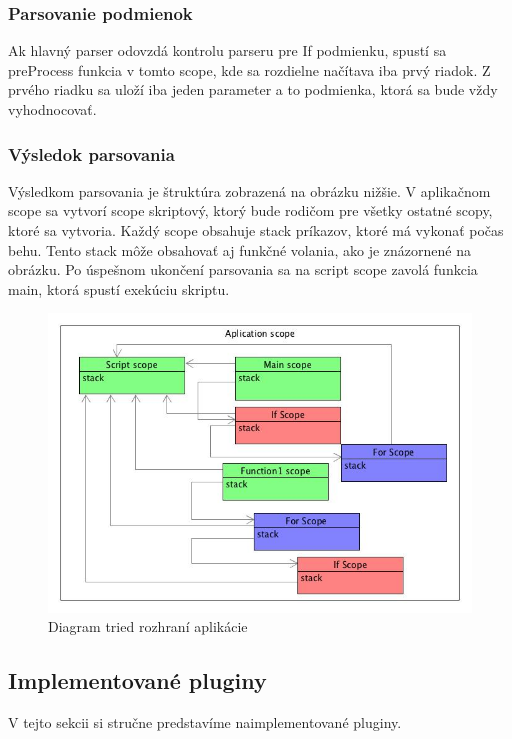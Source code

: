 {\subsubsection{Parsovanie podmienok}
\indent Ak hlavný parser odovzdá kontrolu parseru pre If podmienku, spustí sa preProcess funkcia v tomto scope, kde sa rozdielne načítava iba prvý riadok.
Z prvého riadku sa uloží iba jeden parameter a to podmienka, ktorá sa bude vždy vyhodnocovať.
\subsubsection{Výsledok parsovania}
\indent Výsledkom parsovania je štruktúra zobrazená na obrázku nižšie. V aplikačnom scope sa vytvorí scope skriptový, ktorý bude rodičom pre všetky ostatné scopy, ktoré sa vytvoria. Každý scope obsahuje stack príkazov, ktoré má vykonať počas behu. Tento stack môže obsahovať aj funkčné volania, ako je znázornené na obrázku. Po úspešnom ukončení parsovania sa na script scope zavolá funkcia main, ktorá spustí exekúciu skriptu.
\begin{figure}[H]
	\centering
	\includegraphics[width=\linewidth]{img/scopeStruct.jpg}
	\caption{Diagram tried rozhraní aplikácie}
	\label{fig:test}
\end{figure}
\subsection{Implementované pluginy}
\indent V tejto sekcii si stručne predstavíme naimplementované pluginy.
}
